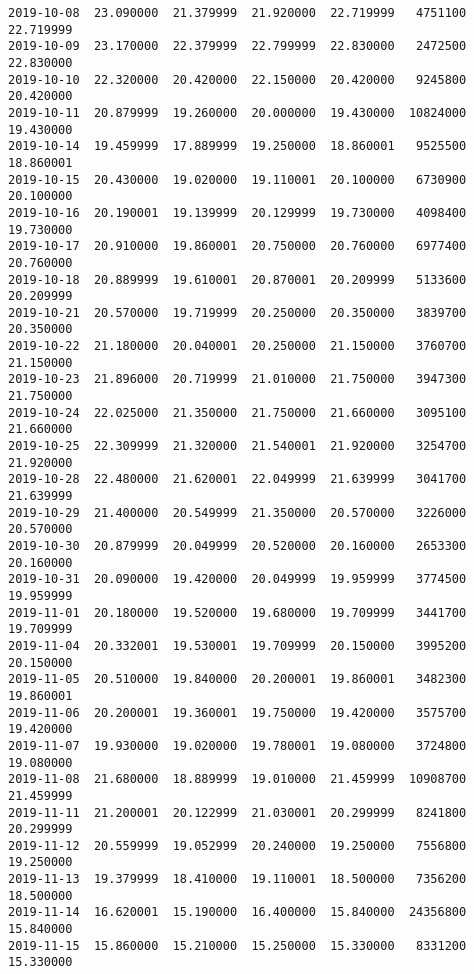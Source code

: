 \documentclass[11pt]{article}
\begin{document}
\begin{Verbatim}[commandchars=\\\{\}]
2019-10-08  23.090000  21.379999  21.920000  22.719999   4751100  22.719999
2019-10-09  23.170000  22.379999  22.799999  22.830000   2472500  22.830000
2019-10-10  22.320000  20.420000  22.150000  20.420000   9245800  20.420000
2019-10-11  20.879999  19.260000  20.000000  19.430000  10824000  19.430000
2019-10-14  19.459999  17.889999  19.250000  18.860001   9525500  18.860001
2019-10-15  20.430000  19.020000  19.110001  20.100000   6730900  20.100000
2019-10-16  20.190001  19.139999  20.129999  19.730000   4098400  19.730000
2019-10-17  20.910000  19.860001  20.750000  20.760000   6977400  20.760000
2019-10-18  20.889999  19.610001  20.870001  20.209999   5133600  20.209999
2019-10-21  20.570000  19.719999  20.250000  20.350000   3839700  20.350000
2019-10-22  21.180000  20.040001  20.250000  21.150000   3760700  21.150000
2019-10-23  21.896000  20.719999  21.010000  21.750000   3947300  21.750000
2019-10-24  22.025000  21.350000  21.750000  21.660000   3095100  21.660000
2019-10-25  22.309999  21.320000  21.540001  21.920000   3254700  21.920000
2019-10-28  22.480000  21.620001  22.049999  21.639999   3041700  21.639999
2019-10-29  21.400000  20.549999  21.350000  20.570000   3226000  20.570000
2019-10-30  20.879999  20.049999  20.520000  20.160000   2653300  20.160000
2019-10-31  20.090000  19.420000  20.049999  19.959999   3774500  19.959999
2019-11-01  20.180000  19.520000  19.680000  19.709999   3441700  19.709999
2019-11-04  20.332001  19.530001  19.709999  20.150000   3995200  20.150000
2019-11-05  20.510000  19.840000  20.200001  19.860001   3482300  19.860001
2019-11-06  20.200001  19.360001  19.750000  19.420000   3575700  19.420000
2019-11-07  19.930000  19.020000  19.780001  19.080000   3724800  19.080000
2019-11-08  21.680000  18.889999  19.010000  21.459999  10908700  21.459999
2019-11-11  21.200001  20.122999  21.030001  20.299999   8241800  20.299999
2019-11-12  20.559999  19.052999  20.240000  19.250000   7556800  19.250000
2019-11-13  19.379999  18.410000  19.110001  18.500000   7356200  18.500000
2019-11-14  16.620001  15.190000  16.400000  15.840000  24356800  15.840000
2019-11-15  15.860000  15.210000  15.250000  15.330000   8331200  15.330000


\end{Verbatim}
\end{document}
